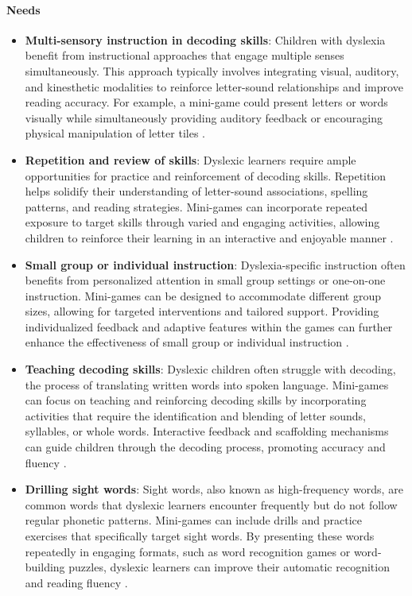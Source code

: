 \paragraph{\textbf{Needs}}
\begin{itemize}
    \item \textbf{Multi-sensory instruction in decoding skills}: Children with dyslexia benefit from instructional approaches that engage multiple senses simultaneously. This approach typically involves integrating visual, auditory, and kinesthetic modalities to reinforce letter-sound relationships and improve reading accuracy. For example, a mini-game could present letters or words visually while simultaneously providing auditory feedback or encouraging physical manipulation of letter tiles \cite{dyslexiaUnderstanding}. 
    \item \textbf{Repetition and review of skills}: Dyslexic learners require ample opportunities for practice and reinforcement of decoding skills. Repetition helps solidify their understanding of letter-sound associations, spelling patterns, and reading strategies. Mini-games can incorporate repeated exposure to target skills through varied and engaging activities, allowing children to reinforce their learning in an interactive and enjoyable manner \cite{dyslexiaUnderstanding}. 
    \item \textbf{Small group or individual instruction}: Dyslexia-specific instruction often benefits from personalized attention in small group settings or one-on-one instruction. Mini-games can be designed to accommodate different group sizes, allowing for targeted interventions and tailored support. Providing individualized feedback and adaptive features within the games can further enhance the effectiveness of small group or individual instruction \cite{dyslexiaUnderstanding}. 
    \item \textbf{Teaching decoding skills}: Dyslexic children often struggle with decoding, the process of translating written words into spoken language. Mini-games can focus on teaching and reinforcing decoding skills by incorporating activities that require the identification and blending of letter sounds, syllables, or whole words. Interactive feedback and scaffolding mechanisms can guide children through the decoding process, promoting accuracy and fluency \cite{dyslexiaUnderstanding}. 
    \item \textbf{Drilling sight words}: Sight words, also known as high-frequency words, are common words that dyslexic learners encounter frequently but do not follow regular phonetic patterns. Mini-games can include drills and practice exercises that specifically target sight words. By presenting these words repeatedly in engaging formats, such as word recognition games or word-building puzzles, dyslexic learners can improve their automatic recognition and reading fluency \cite{dyslexiaUnderstanding}. 

\end{itemize}
